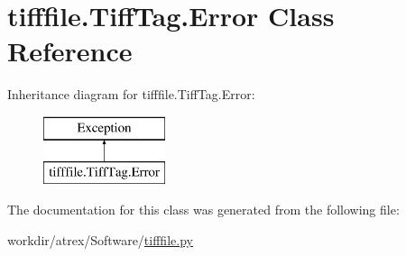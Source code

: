 \hypertarget{classtifffile_1_1_tiff_tag_1_1_error}{\section{tifffile.\-Tiff\-Tag.\-Error Class Reference}
\label{classtifffile_1_1_tiff_tag_1_1_error}
}
Inheritance diagram for tifffile.\-Tiff\-Tag.\-Error\-:\begin{figure}[H]
\begin{center}
\leavevmode
\includegraphics[height=2.000000cm]{classtifffile_1_1_tiff_tag_1_1_error}
\end{center}
\end{figure}


The documentation for this class was generated from the following file\-:\begin{DoxyCompactItemize}
\item 
workdir/atrex/\-Software/\hyperlink{tifffile_8py}{tifffile.\-py}\end{DoxyCompactItemize}

